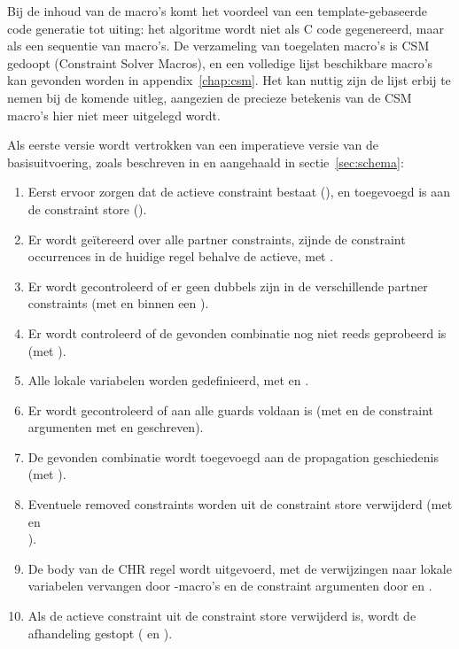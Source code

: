 Bij de inhoud van de macro's komt het voordeel van een template-gebaseerde code generatie tot uiting: het algoritme wordt niet als C code gegenereerd, maar als een sequentie van macro's. De verzameling van toegelaten macro's is CSM gedoopt (Constraint Solver Macros), en een volledige lijst beschikbare macro's kan gevonden worden in appendix~\ref{chap:csm}. Het kan nuttig zijn de lijst erbij te nemen bij de komende uitleg, aangezien de precieze betekenis van de CSM macro's hier niet meer uitgelegd wordt.

Als eerste versie wordt vertrokken van een imperatieve versie van de basisuitvoering, zoals beschreven in \cite{tomsphdthesis} en aangehaald in sectie~\ref{sec:schema}:
\begin{enumerate}
  \item Eerst ervoor zorgen dat de actieve constraint bestaat (), en toegevoegd is aan de constraint store ().
  \item Er wordt ge\"itereerd over alle partner constraints, zijnde de constraint occurrences in de huidige regel behalve de actieve, met .
  \item Er wordt gecontroleerd of er geen dubbels zijn in de verschillende partner constraints (met  en  binnen een ).
  \item Er wordt controleerd of de gevonden combinatie nog niet reeds geprobeerd is (met ).
  \item Alle lokale variabelen worden gedefinieerd, met  en .
  \item Er wordt gecontroleerd of aan alle guards voldaan is (met  en de constraint argumenten met  en  geschreven).
  \item De gevonden combinatie wordt toegevoegd aan de propagation geschiedenis (met ).
  \item Eventuele removed constraints worden uit de constraint store verwijderd (met  en \\ ).
  \item De body van de CHR regel wordt uitgevoerd, met de verwijzingen naar lokale variabelen vervangen door -macro's en de constraint argumenten door  en .
  \item Als de actieve constraint uit de constraint store verwijderd is, wordt de afhandeling gestopt ( en ).
\end{enumerate}

